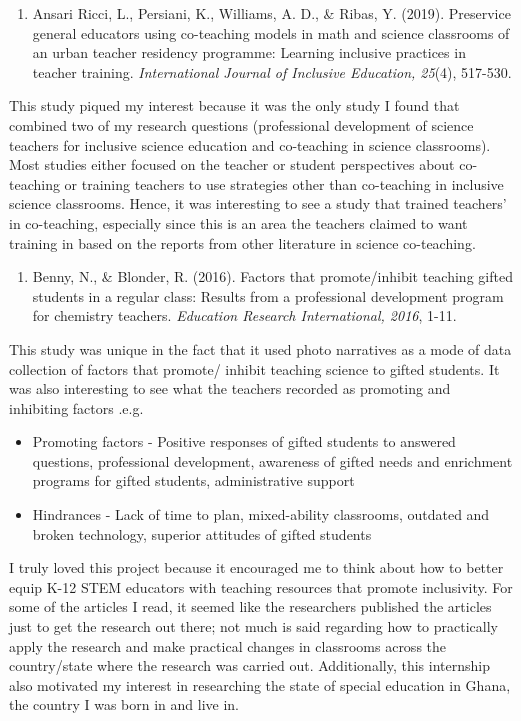 \documentclass[11.5pt]{sig-alternate}
\begin{document}
\begin{large}
\begin{enumerate}[start=2]
    \item  Ansari Ricci, L., Persiani, K., Williams, A. D., \& Ribas, Y. (2019). Preservice general educators using co-teaching models in math and science classrooms of an urban teacher residency programme: Learning inclusive practices in teacher training. \textit{International Journal of Inclusive Education, 25}(4), 517-530.
\end{enumerate}
This study piqued my interest because it was the only study I found that combined two of my research questions (professional development of science teachers for inclusive science education and co-teaching in science classrooms). Most studies either focused on the teacher or student perspectives about co-teaching or training teachers to use strategies other than co-teaching in inclusive science classrooms. Hence, it was interesting to see a study that trained teachers’ in co-teaching, especially since this is an area the teachers claimed to want training in based on the reports from other literature in science co-teaching.

\begin{enumerate}[start=3]
    \item  Benny, N., \& Blonder, R. (2016). Factors that promote/inhibit teaching gifted students in a regular class: Results from a professional development program for chemistry teachers. \textit{Education Research International, 2016}, 1-11.
\end{enumerate}
This study was unique in the fact that it used photo narratives as a mode of data collection of factors that promote/ inhibit teaching science to gifted students. It was also interesting to see what the teachers recorded as promoting and inhibiting factors .e.g. 
 
\begin{itemize}
    \item Promoting factors - Positive responses of gifted students to answered questions, professional development, awareness of gifted needs and enrichment programs for gifted students, administrative support
    \item Hindrances - Lack of time to plan, mixed-ability classrooms, outdated and broken technology, superior attitudes of gifted students
\end{itemize}
I truly loved this project because it encouraged me to think about how to better equip K-12 STEM educators with teaching resources that promote inclusivity. For some of the articles I read, it seemed like the researchers published the articles just to get the research out there; not much is said regarding how to practically apply the research and make practical changes in classrooms across the country/state where the research was carried out. Additionally, this internship also motivated my interest in researching the state of special education in Ghana, the country I was born in and live in.


\end{large}
\end{document}
